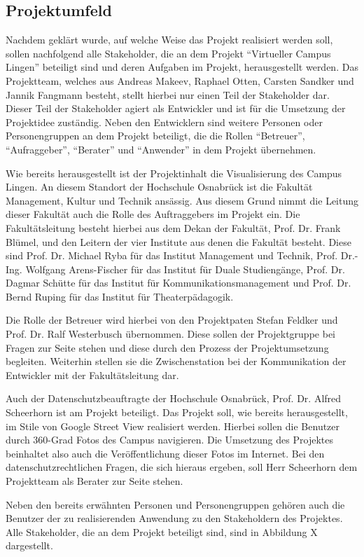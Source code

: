 \subsection{Projektumfeld}
\label{sec:Projektumfeld}


Nachdem geklärt wurde, auf welche Weise das Projekt realisiert werden soll,
sollen nachfolgend alle Stakeholder, die an dem Projekt "`Virtueller Campus
Lingen"' beteiligt sind und deren Aufgaben im Projekt, herausgestellt werden.
Das Projektteam, welches aus Andreas Makeev, Raphael Otten, Carsten Sandker und
Jannik Fangmann besteht, stellt hierbei nur einen Teil der Stakeholder dar.
Dieser Teil der Stakeholder agiert als Entwickler und ist für die Umsetzung der
Projektidee zuständig. Neben den Entwicklern sind weitere Personen oder
Personengruppen an dem Projekt beteiligt, die die Rollen "`Betreuer"',
"`Aufraggeber"', "`Berater"' und "`Anwender"' in dem Projekt übernehmen.

Wie bereits herausgestellt ist der Projektinhalt die Visualisierung des Campus
Lingen. An diesem Standort der Hochschule Osnabrück ist die Fakultät
Management, Kultur und Technik ansässig. Aus diesem Grund nimmt die Leitung
dieser Fakultät auch die Rolle des Auftraggebers im Projekt ein. Die
Fakultätsleitung besteht hierbei aus dem Dekan der Fakultät, Prof. Dr. Frank
Blümel, und den Leitern der vier Institute aus denen die Fakultät besteht.
Diese sind Prof. Dr. Michael Ryba für das Institut Management und Technik,
Prof. Dr.-Ing. Wolfgang Arens-Fischer für das Institut für Duale Studiengänge,
Prof. Dr. Dagmar Schütte für das Institut für Kommunikationsmanagement und
Prof. Dr. Bernd Ruping für das Institut für Theaterpädagogik.

Die Rolle der Betreuer wird hierbei von den Projektpaten Stefan Feldker und
Prof. Dr. Ralf Westerbusch übernommen. Diese sollen der Projektgruppe bei
Fragen zur Seite stehen und diese durch den Prozess der Projektumsetzung
begleiten. Weiterhin stellen sie die Zwischenstation bei der Kommunikation der
Entwickler mit der Fakultätsleitung dar.

Auch der Datenschutzbeauftragte der Hochschule Osnabrück, Prof. Dr. Alfred
Scheerhorn ist am Projekt beteiligt. Das Projekt soll, wie bereits
herausgestellt, im Stile von Google Street View realisiert werden. Hierbei
sollen die Benutzer durch 360-Grad Fotos des Campus navigieren. Die Umsetzung
des Projektes beinhaltet also auch die Veröffentlichung dieser Fotos im
Internet. Bei den datenschutzrechtlichen Fragen, die sich hieraus ergeben, soll
Herr Scheerhorn dem Projektteam als Berater zur Seite stehen.

Neben den bereits erwähnten Personen und Personengruppen gehören auch die
Benutzer der zu realisierenden Anwendung zu den Stakeholdern des Projektes.
Alle Stakeholder, die an dem Projekt beteiligt sind, sind in Abbildung X
dargestellt.
